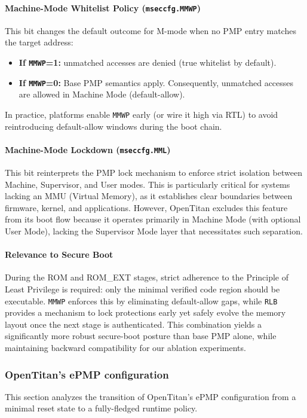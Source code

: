 \documentclass[10pt,a4paper,twocolumn,twoside]{article}
\begin{document}
\paragraph{Machine-Mode Whitelist Policy (\texttt{mseccfg.MMWP})}
This bit changes the default outcome for M-mode when no PMP entry matches the target address:
\begin{itemize}
\item \textbf{If \texttt{MMWP}=1:} unmatched accesses are denied (true whitelist by default).
\item \textbf{If \texttt{MMWP}=0:} Base PMP semantics apply. Consequently, unmatched accesses are allowed in Machine Mode (default-allow).
\end{itemize}
In practice, platforms enable \texttt{MMWP} early (or wire it high via RTL) to avoid reintroducing default-allow windows during the boot chain.

\paragraph{Machine-Mode Lockdown (\texttt{mseccfg.MML})}
This bit reinterprets the PMP lock mechanism to enforce strict isolation between Machine, Supervisor, and User modes. This is particularly critical for systems lacking an MMU (Virtual Memory), as it establishes clear boundaries between firmware, kernel, and applications. However, OpenTitan excludes this feature from its boot flow because it operates primarily in Machine Mode (with optional User Mode), lacking the Supervisor Mode layer that necessitates such separation.

\paragraph{Relevance to Secure Boot}
During the ROM and ROM\_EXT stages, strict adherence to the Principle of Least Privilege is required: only the minimal verified code region should be executable. \texttt{MMWP} enforces this by eliminating default-allow gaps, while \texttt{RLB} provides a mechanism to lock protections early yet safely evolve the memory layout once the next stage is authenticated. This combination yields a significantly more robust secure-boot posture than base PMP alone, while maintaining backward compatibility for our ablation experiments.

\subsubsection{OpenTitan's ePMP configuration}
This section analyzes the transition of OpenTitan's ePMP configuration from a minimal reset state to a fully-fledged runtime policy.
\end{document}
